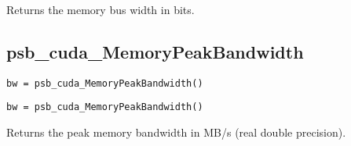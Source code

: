 Returns the memory bus width in bits.

\subsection*{psb\_cuda\_MemoryPeakBandwidth }

\ifpdf
\begin{verbatim}
bw = psb_cuda_MemoryPeakBandwidth()
\end{verbatim}
\else
\begin{center}
    \begin{minipage}[tl]{0.9\textwidth}
\begin{verbatim} 
bw = psb_cuda_MemoryPeakBandwidth()
\end{verbatim}
    \end{minipage}
  \end{center}
\fi
Returns the peak memory bandwidth in MB/s (real double precision).



